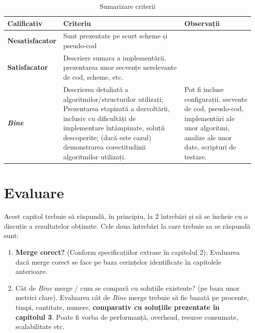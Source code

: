 \documentclass[12pt,a4paper]{report}
\begin{document}
\begin{table}[th]\small\linespread{1}
\caption{Sumarizare criterii}
\label{tab:criterii}
\begin{tabular}{l >{\raggedright\arraybackslash}p{8cm} >{\raggedright\arraybackslash}p{4cm}}
\textbf{Calificativ} & \textbf{Criteriu} & \textbf{Observații} \\\hline
\textbf{Nesatisfacator} & Sunt prezentate pe scurt scheme și pseudo-cod & \\\hline
\textbf{Satisfacator} &Descriere sumara a implementării, prezentarea unor secvențe nerelevante de cod, scheme, etc.& \\
\hline
\textbf{\textit{Bine}} &Descrierea detaliată a algoritmilor/structurilor utilizați; Prezentarea etapizată a dezvoltării, inclusiv cu dificultăți de implementare întâmpinate, soluții descoperite; (dacă este cazul) demonstrarea corectitudinii algoritmilor utilizați. & Pot fi incluse configurații, secvente de cod, pseudo-cod, implementări ale unor algoritmi, analize ale unor date, scripturi de testare. \\
\hline
\end{tabular}
\end{table}


\chapter{Evaluare}
Acest capitol trebuie să răspundă, în principiu, la 2 întrebări și să se încheie cu o discuție a rezultatelor obținute. Cele doua întrebări la care trebuie sa se răspundă sunt:
\begin{enumerate}
	\item  \textbf{Merge corect?} (Conform specificațiilor extrase în capitolul 2); 
Evaluarea dacă merge corect se face pe baza cerințelor identificate în capitolele anterioare. 

	\item Cât de \textit{Bine} merge / cum se compară cu soluțiile existente? (pe baza unor metrici clare). 
Evaluarea cât de \textit{Bine} merge trebuie să fie bazată pe procente, timpi, cantitate, numere, \textbf{comparativ cu soluțiile prezentate în capitolul 3}. Poate fi vorba de performanță, overhead, resurse consumate, scalabilitate etc. 
\end{enumerate}
\end{document}
